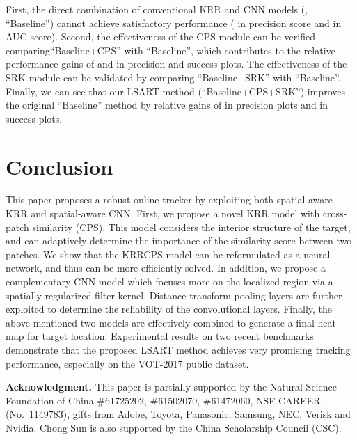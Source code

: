 \documentclass[10pt,twocolumn,letterpaper]{article}
\begin{document}
First,  the direct combination of conventional KRR and CNN models (\ie, ``Baseline'') cannot achieve
satisfactory performance ( in precision score and  in AUC score).
Second, the effectiveness of the CPS module can be verified comparing``Baseline+CPS'' with ``Baseline'',
which contributes to the relative performance gains of  and  in precision and success plots.
The effectiveness of the SRK module can be validated by comparing ``Baseline+SRK'' with ``Baseline''.
Finally, we can see that our LSART method (``Baseline+CPS+SRK'') improves the
original ``Baseline'' method by relative gains of  in precision plots and  in success plots.

\vspace{-2mm}
\section{Conclusion}
This paper proposes a robust online tracker by exploiting both spatial-aware KRR and spatial-aware
CNN.
First, we propose a novel KRR model with cross-patch similarity (CPS). This model considers the interior
structure of the target, and can adaptively determine the importance of the similarity score between two
patches. We show that the KRRCPS model can be reformulated as a neural network, and thus can be more
efficiently solved.
In addition, we propose a complementary CNN model which focuses more on the localized region via
a spatially regularized filter kernel. Distance transform pooling layers are further exploited to determine
the reliability of the convolutional layers.
Finally, the above-mentioned two models are effectively combined to generate a final heat map for target
location. Experimental results on two recent benchmarks demonstrate that the proposed LSART method
achieves very promising tracking performance, especially on the VOT-2017 public dataset.

\textbf{Acknowledgment.} This paper is partially supported by the Natural Science
Foundation of China \#61725202, \#61502070, \#61472060, NSF CAREER (No.~1149783), gifts from Adobe, Toyota, Panasonic, Samsung, NEC, Verisk and Nvidia.
Chong Sun is also supported by the China Scholarship Council (CSC).
\end{document}
